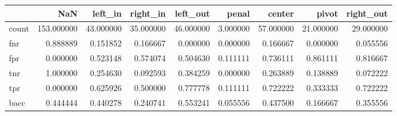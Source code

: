 \begin{tabular}{lrrrrrrrr}
\toprule
{} &         NaN &    left\_in &   right\_in &   left\_out &     penal &     center &      pivot &  right\_out \\
\midrule
count &  153.000000 &  43.000000 &  35.000000 &  46.000000 &  3.000000 &  57.000000 &  21.000000 &  29.000000 \\
fnr   &    0.888889 &   0.151852 &   0.166667 &   0.000000 &  0.000000 &   0.166667 &   0.000000 &   0.055556 \\
fpr   &    0.000000 &   0.523148 &   0.574074 &   0.504630 &  0.111111 &   0.736111 &   0.861111 &   0.816667 \\
tnr   &    1.000000 &   0.254630 &   0.092593 &   0.384259 &  0.000000 &   0.263889 &   0.138889 &   0.072222 \\
tpr   &    0.000000 &   0.625926 &   0.500000 &   0.777778 &  0.111111 &   0.722222 &   0.333333 &   0.722222 \\
bacc  &    0.444444 &   0.440278 &   0.240741 &   0.553241 &  0.055556 &   0.437500 &   0.166667 &   0.355556 \\
\bottomrule
\end{tabular}

